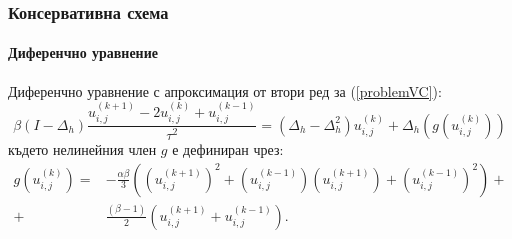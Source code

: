 \documentclass{beamer}
\newcommand{\rf}[1]{(\ref{#1})}
\begin{document}

\begin{frame}
\frametitle{Консервативна схема}
\framesubtitle{Диференчно уравнение}
Диференчно уравнение с апроксимация от втори ред за \rf{problemVC}:
\begin{equation}\label{problemVCDiscrete}
\beta (I-\Delta_h)\frac{ u^{(k+1)}_{i, j} - 2u^{(k)}_{i,j} + u^{(k-1)}_{i,j} }{\tau^2} = (\Delta_h - \Delta_h^2)u^{(k)}_{i,j} + \Delta_h(g(u^{(k)}_{i,j}))
\end{equation}
%
където нелинейния член $g$ е дефиниран чрез:
\begin{align}
g(u^{(k)}_{i,j})=& -\frac{\alpha \beta} { 3 } \left( (u^{(k+1)}_{i,j})^2 + (u^{(k-1)}_{i,j})(u^{(k+1)}_{i,j}) + (u^{(k-1)}_{i,j})^2 \right) + \nonumber\\
+&\frac{ (\beta - 1 )}{ 2 }\left( u^{(k+1)}_{i,j} + u^{(k-1)}_{i,j} \right).
\end{align}


\end{frame}


\end{document}
